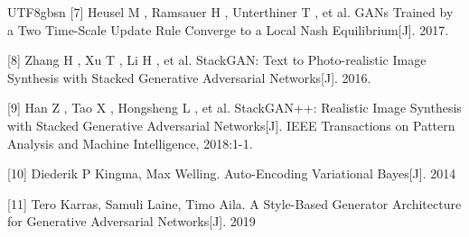 \documentclass{article}
\begin{document}
\begin{CJK*}{UTF8}{gbsn}
[7] Heusel M , Ramsauer H , Unterthiner T , et al. GANs Trained by a Two Time-Scale Update Rule Converge to a Local Nash Equilibrium[J]. 2017.

[8] Zhang H , Xu T , Li H , et al. StackGAN: Text to Photo-realistic Image Synthesis with Stacked Generative Adversarial Networks[J]. 2016.

[9] Han Z , Tao X , Hongsheng L , et al. StackGAN++: Realistic Image Synthesis with Stacked Generative Adversarial Networks[J]. IEEE Transactions on Pattern Analysis and Machine Intelligence, 2018:1-1.

[10] Diederik P Kingma, Max Welling. Auto-Encoding Variational Bayes[J]. 2014

[11] Tero Karras, Samuli Laine, Timo Aila. A Style-Based Generator Architecture for Generative Adversarial Networks[J]. 2019

\end{CJK*}
\end{document}
